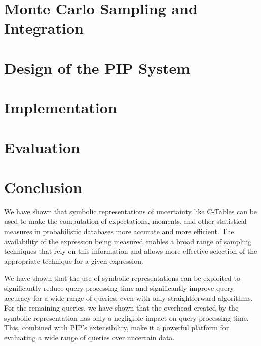 \documentclass[10pt,conference,letterpaper]{IEEEtran}
\begin{document}
\section{Monte Carlo Sampling and Integration}
\label{sec:sampling}


\section{Design of the PIP System}
\label{sec:design}


\section{Implementation}
\label{sec:implementation}


\section{Evaluation}
\label{sec:evaluation}



\section{Conclusion}

We have shown that symbolic representations of uncertainty like C-Tables can be used to make the computation of expectations, moments, and other statistical measures in probabilistic databases more accurate and more efficient.  The availability of the expression being measured enables a broad range of sampling techniques that rely on this information and allows more effective selection of the appropriate technique for a given expression.

We have shown that the use of symbolic representations can be exploited to significantly reduce query processing time and significantly improve query accuracy for a wide range of queries, even with only straightforward algorithms.  For the remaining queries, we have shown that the overhead created by the symbolic representation has only a negligible impact on query processing time.  This, combined with PIP's extensibility, make it a powerful platform for evaluating a wide range of queries over uncertain data.
%
%

\begin{small}


\end{small}
\end{document}
